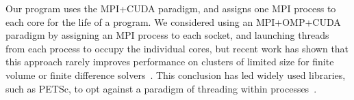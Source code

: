 Our program uses the MPI\allowbreak+CUDA paradigm, and assigns one MPI process to each core for the life of a program.
We considered using an MPI\allowbreak+OMP\allowbreak+CUDA paradigm by assigning an MPI process to each socket, and
launching threads from each process to occupy the individual cores, but recent work has shown that
this approach rarely improves performance on clusters of limited size for finite volume or finite
difference solvers~\cite{IDAHO_MPI_CUDA, PerfAnalysisHetero}.
This conclusion has led widely used libraries, such as PETSc, to opt against a paradigm of threading
within processes~\cite{MillsPetsc}.
